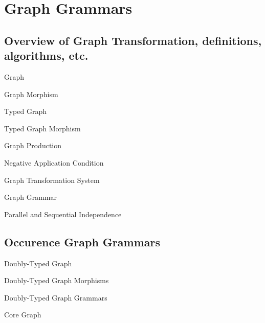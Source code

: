 \chapter{Graph Grammars}

\section{Overview of Graph Transformation, definitions, algorithms, etc.}

\cite{Ribeiro1996}

\begin{mydef}{Graph}
\end{mydef}

\begin{mydef}{Graph Morphism}
\end{mydef}

\begin{mydef}{Typed Graph}
\end{mydef}

\begin{mydef}{Typed Graph Morphism}
\end{mydef}


\begin{mydef}{Graph Production}
\end{mydef}

\begin{mydef}{Negative Application Condition}

\centerline{}

\end{mydef}

\begin{mydef}{Graph Transformation System}
\end{mydef}

\begin{mydef}{Graph Grammar}
\end{mydef}

\begin{mydef}{Parallel and Sequential Independence}
\end{mydef}


\section{Occurence Graph Grammars}

\begin{mydef}{Doubly-Typed Graph}
\end{mydef}

\begin{mydef}{Doubly-Typed Graph Morphisms}
\end{mydef}

\begin{mydef}{Doubly-Typed Graph Grammars}
\end{mydef}

\begin{mydef}{Core Graph}
\end{mydef}
